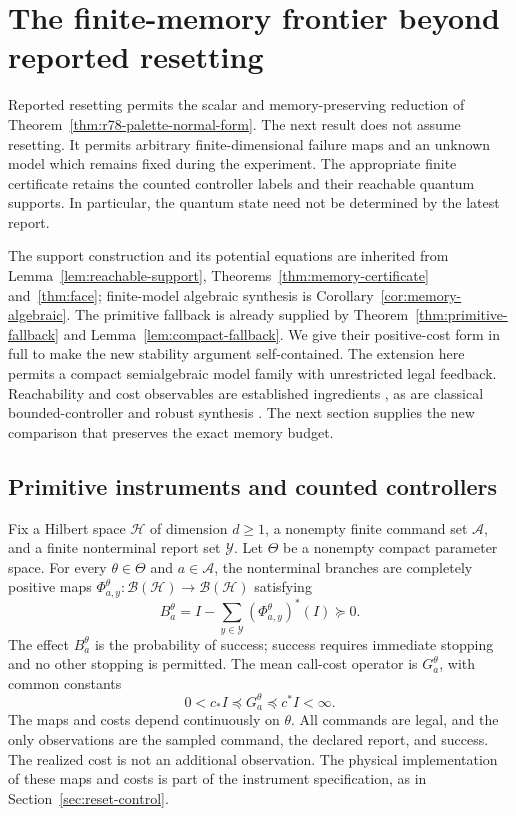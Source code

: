 \section{The finite-memory frontier beyond reported resetting}
\label{sec:r79-quantum-frontier}

Reported resetting permits the scalar and memory-preserving reduction
of Theorem~\ref{thm:r78-palette-normal-form}.  The next result does not
assume resetting.  It permits arbitrary finite-dimensional failure
maps and an unknown model which remains fixed during the experiment.
The appropriate finite certificate retains the counted controller
labels and their reachable quantum supports.  In particular, the
quantum state need not be determined by the latest report.

The support construction and its potential equations are inherited
from Lemma~\ref{lem:reachable-support},
Theorems~\ref{thm:memory-certificate} and~\ref{thm:face}; finite-model
algebraic synthesis is Corollary~\ref{cor:memory-algebraic}.
The primitive fallback is already supplied by
Theorem~\ref{thm:primitive-fallback} and
Lemma~\ref{lem:compact-fallback}.  We give their positive-cost form
in full to make the new stability argument self-contained.  The
extension here permits a compact semialgebraic model family with
unrestricted legal feedback.  Reachability and cost observables
are established ingredients
\cite{YuYing12,YingFengYuYing13,LiuZhouBartheYing25,AvanziniEtAl22},
as are classical bounded-controller and robust synthesis
\cite{AmatoBernsteinZilberstein10,JungesEtAl18,CubuktepeEtAl21,
GaleslootEtAl25}.  The next section supplies the new comparison
that preserves the exact memory budget.

\subsection{Primitive instruments and counted controllers}

Fix a Hilbert space $\mathcal H$ of dimension $d\ge1$, a nonempty
finite command set $\mathcal A$, and a finite nonterminal report set
$\mathcal Y$.  Let $\Theta$ be a nonempty compact parameter space.
For every $\theta\in\Theta$ and $a\in\mathcal A$, the nonterminal
branches are completely positive maps
$\Phi^\theta_{a,y}:\mathcal B(\mathcal H)\to
\mathcal B(\mathcal H)$ satisfying
\[
 B^\theta_a=I-\sum_{y\in\mathcal Y}
                    (\Phi^\theta_{a,y})^*(I)\succeq0.
\]
The effect $B^\theta_a$ is the probability of success; success
requires immediate stopping and no other stopping is permitted.
The mean call-cost operator is $G^\theta_a$, with common constants
\begin{equation}\label{eq:r79-positive-costs}
 0<c_*I\preccurlyeq G^\theta_a\preccurlyeq c^*I<\infty.
\end{equation}
The maps and costs depend continuously on $\theta$.  All commands
are legal, and the only observations are the sampled command, the
declared report, and success.  The realized cost is not an additional
observation.  The physical implementation of these maps and costs is
part of the instrument specification, as in
Section~\ref{sec:reset-control}.

